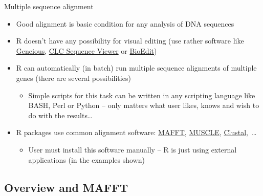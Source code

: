 \documentclass[compress, ucs, xelatex, 11pt, xcolor=svgnames,
  hyperref={
    bookmarks=true,
    unicode=true,
    colorlinks=true,
    pdftitle={Molecular data in R},
    plainpages=false,
    pdfauthor={Vojtech Zeisek},
    pdfsubject={Course about phylogeny and evolution in R},
    pdfcreator={XeLaTeX},
    pdfkeywords={R, evolution, phylogeny, molecular data},
    linkcolor=Tomato,
    anchorcolor=SaddleBrown,
    citecolor=Goldenrod,
    filecolor=DarkMagenta,
    menucolor=Sienna,
    urlcolor=DarkTurquoise,
    pdftex},
  url={hyphens, lowtilde} %
  ]{beamer}
\begin{document}
\begin{frame}{Multiple sequence alignment}
  \label{alignment}
  \begin{itemize}
    \item Good alignment is basic condition for any analysis of DNA sequences
    \item R doesn't have any possibility for visual editing (use rather software like \href{http://www.geneious.com/}{Geneious}, \href{http://www.clcbio.com/products/clc-sequence-viewer/}{CLC Sequence Viewer} or \href{http://www.mbio.ncsu.edu/bioedit/bioedit.html}{BioEdit})
    \item R can automatically (in batch) run multiple sequence alignments of multiple genes (there are several possibilities)
    \begin{itemize}
      \item Simple scripts for this task can be written in any scripting language like BASH, Perl or Python -- only matters what user likes, knows and wish to do with the results\ldots
    \end{itemize}
    \item R packages use common alignment software: \href{http://mafft.cbrc.jp/alignment/software/}{MAFFT}, \href{http://www.drive5.com/muscle/}{MUSCLE}, \href{http://www.clustal.org/}{Clustal},~\ldots
    \begin{itemize}
      \item User must install this software manually -- R is just using external applications (in the examples shown)
    \end{itemize}
  \end{itemize}
\end{frame}

\subsection{Overview and MAFFT}
\end{document}
